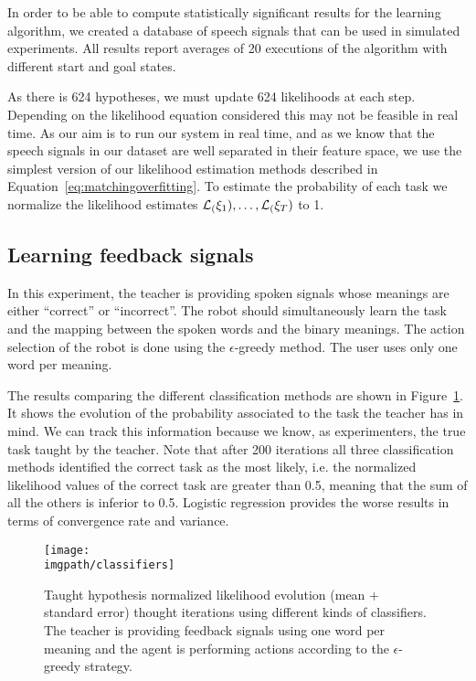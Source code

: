 In order to be able to compute statistically significant results for the learning algorithm, we created a database of speech signals that can be used in simulated experiments. All results report averages of 20 executions of the algorithm with different start and goal states. 

As there is 624 hypotheses, we must update 624 likelihoods at each step. Depending on the likelihood equation considered this may not be feasible in real time. As our aim is to run our system in real time, and as we know that the speech signals in our dataset are well separated in their feature space, we use the simplest version of our likelihood estimation methods described in Equation~\ref{eq:matchingoverfitting}. To estimate the probability of each task we normalize the likelihood estimates $\mathcal{L}_(\xi_1),\ldots,\mathcal{L}_(\xi_T)$ to 1.


\subsection{Learning feedback signals}

In this experiment, the teacher is providing spoken signals whose meanings are either ``correct'' or ``incorrect''. The robot should simultaneously learn the task and the mapping between the spoken words and the binary meanings. The action selection of the robot is done using the $\epsilon$-greedy method. The user uses only one word per meaning.

The results comparing the different classification methods are shown in Figure~\ref{fig:FeedbackOneWord}. It shows the evolution of the probability associated to the task the teacher has in mind. We can track this information because we know, as experimenters, the true task taught by the teacher. Note that after 200 iterations all three classification methods identified the correct task as the most likely, i.e. the normalized likelihood values of the correct task are greater than 0.5, meaning that the sum of all the others is inferior to 0.5. Logistic regression provides the worse results in terms of convergence rate and variance.

\begin{figure}[!htbp]
  \centering
  \texttt{[image: \\imgpath/classifiers]}
  \caption{Taught hypothesis normalized likelihood evolution (mean + standard error) thought iterations using different kinds of classifiers. The teacher is providing feedback signals using one word per meaning and the agent is performing actions according to the $\epsilon$-greedy strategy.}
  \label{fig:FeedbackOneWord}
\end{figure}

